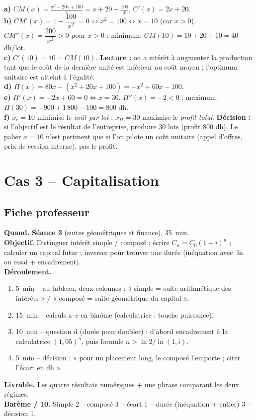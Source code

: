 \documentclass[12pt,a4paper]{article}
\begin{document}
\begin{corrigebox}
\textbf{a)} $\displaystyle CM(x)=\frac{x^2+20x+100}{x}=x+20+\frac{100}{x}$, $C'(x)=2x+20$.\\
\textbf{b)} $CM'(x)=1-\dfrac{100}{x^2}=0 \Leftrightarrow x^2=100 \Leftrightarrow x=10$ (car $x>0$).
$CM''(x)=\dfrac{200}{x^3}>0$ pour $x>0$ : minimum. $CM(10)=10+20+10=40$ dh/lot.\\
\textbf{c)} $C'(10)=40=CM(10)$. \textbf{Lecture :} on a intérêt à augmenter la production tant que le coût de la dernière unité est inférieur au coût moyen ; l'optimum unitaire est atteint à l'égalité.\\
\textbf{d)} $\Pi(x)=80x-(x^2+20x+100)=-x^2+60x-100$.\\
\textbf{e)} $\Pi'(x)=-2x+60=0 \Leftrightarrow x=30$. $\Pi''(x)=-2<0$ : maximum.
$\Pi(30)=-900+1\,800-100=800$ dh.\\
\textbf{f)} $x_c=10$ minimise le \emph{coût par lot} ; $x_\Pi=30$ maximise le \emph{profit total}. \textbf{Décision :} si l'objectif est le résultat de l'entreprise, produire $30$ lots (profit $800$ dh). Le palier $x=10$ n'est pertinent que si l'on pilote un coût unitaire (appel d'offres, prix de cession interne), pas le profit.
\end{corrigebox}

\section{Cas 3 -- Capitalisation}

\subsection{Fiche professeur}

\begin{profbox}
\textbf{Quand.} \textbf{Séance 3} (suites géométriques et finance), 35~min.\\
\textbf{Objectif.} Distinguer intérêt simple / composé ; écrire $C_n=C_0(1+i)^n$ ; calculer un capital futur ; inverser pour trouver une durée (inéquation avec $\ln$ ou essai + encadrement).\\
\textbf{Déroulement.}
\begin{enumerate}[leftmargin=1.3cm]
  \item 5~min -- au tableau, deux colonnes : « simple = suite arithmétique des intérêts » / « composé = suite géométrique du capital ».
  \item 15~min -- calculs a--c en binôme (calculatrice : touche puissance).
  \item 10~min -- question d (durée pour doubler) : d'abord encadrement à la calculatrice $(1{,}05)^n$, puis formule $n>\ln 2/\ln(1{,}i)$.
  \item 5~min -- décision : « pour un placement long, le composé l'emporte ; citer l'écart en dh ».
\end{enumerate}
\textbf{Livrable.} Les quatre résultats numériques + une phrase comparant les deux régimes.\\
\textbf{Barème / 10.} Simple 2 -- composé 3 -- écart 1 -- durée (inéquation + entier) 3 -- décision 1.
\end{profbox}
\end{document}
